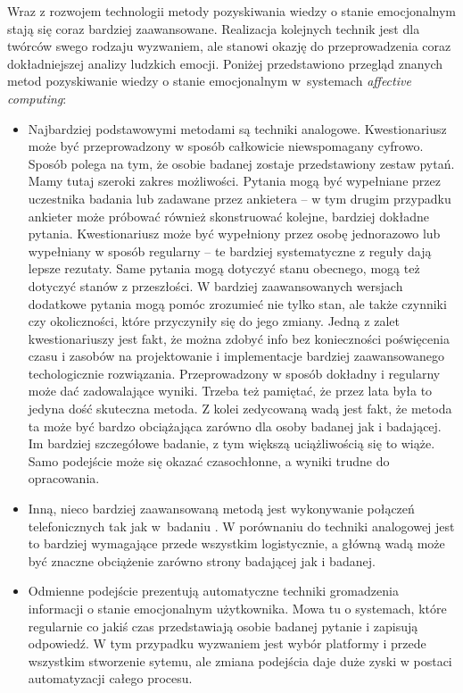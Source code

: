 Wraz z rozwojem technologii metody pozyskiwania wiedzy o stanie emocjonalnym stają się coraz bardziej zaawansowane. Realizacja kolejnych technik jest dla twórców swego rodzaju wyzwaniem, ale stanowi okazję do przeprowadzenia coraz dokładniejszej analizy ludzkich emocji. Poniżej przedstawiono przegląd znanych metod pozyskiwanie wiedzy o stanie emocjonalnym w~systemach \textit{affective computing}:

\begin{itemize}	
	\item Najbardziej podstawowymi metodami są techniki analogowe. Kwestionariusz może być przeprowadzony w sposób całkowicie niewspomagany cyfrowo. Sposób polega na tym, że osobie badanej zostaje przedstawiony zestaw pytań. Mamy tutaj szeroki zakres możliwości. Pytania mogą być wypełniane przez uczestnika badania lub zadawane przez ankietera -- w tym drugim przypadku ankieter może próbować również skonstruować kolejne, bardziej dokładne pytania. Kwestionariusz może być wypełniony przez osobę jednorazowo lub wypełniany w sposób regularny -- te bardziej systematyczne z reguły dają lepsze rezutaty. Same pytania mogą dotyczyć stanu obecnego, mogą też dotyczyć stanów z przeszłości. W bardziej zaawansowanych wersjach dodatkowe pytania mogą pomóc zrozumieć nie tylko stan, ale także czynniki czy okoliczności, które przyczyniły się do jego zmiany. Jedną z zalet kwestionariuszy jest fakt, że można zdobyć info bez konieczności poświęcenia czasu i zasobów na projektowanie i implementacje bardziej zaawansowanego techologicznie rozwiązania. Przeprowadzony w sposób dokładny i regularny może dać zadowalające wyniki. Trzeba też pamiętać, że przez lata była to jedyna dość skuteczna metoda. Z kolei zedycowaną wadą jest fakt, że metoda ta może być bardzo obciążająca zarówno dla osoby badanej jak i badającej. Im bardziej szczegółowe badanie, z tym większą uciążliwością się to wiąże. Samo podejście może się okazać czasochłonne, a wyniki trudne do opracowania.
	
	\item Inną, nieco bardziej zaawansowaną metodą jest wykonywanie połączeń telefonicznych tak jak w~badaniu \cite{courvoisier2010psychometric}. W porównaniu do techniki analogowej jest to bardziej wymagające przede wszystkim logistycznie, a główną wadą może być znaczne obciążenie zarówno strony badającej jak i badanej.
	
	\item Odmienne podejście prezentują automatyczne techniki gromadzenia informacji o stanie emocjonalnym użytkownika. Mowa tu o systemach, które regularnie co jakiś czas przedstawiają osobie badanej pytanie i zapisują odpowiedź. W tym przypadku wyzwaniem jest wybór platformy i przede wszystkim stworzenie sytemu, ale zmiana podejścia daje duże zyski w postaci automatyzacji całego procesu.
	

\end{itemize}
